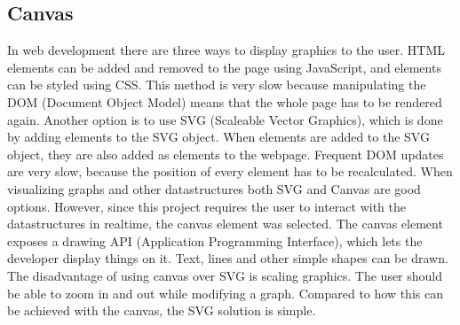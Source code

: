 \subsection{Canvas}
In web development there are three ways to display graphics to the user. HTML elements can be added and removed to the page using JavaScript, and elements can be styled using CSS. This method is very slow because manipulating the DOM (Document Object Model) means that the whole page has to be rendered again. Another option is to use SVG (Scaleable Vector Graphics)\cite{SVG:Info}, which is done by adding elements to the SVG object. When elements are added to the SVG object, they are also added as elements to the webpage. Frequent DOM updates are very slow, because the position of every element has to be recalculated. When visualizing graphs and other datastructures both SVG and Canvas\cite{Canvas:Info} are good options. However, since this project requires the user to interact with the datastructures in realtime, the canvas element was selected. The canvas element exposes a drawing API (Application Programming Interface), which lets the developer display things on it. Text, lines and other simple shapes can be drawn. The disadvantage of using canvas over SVG is scaling graphics. The user should be able to zoom in and out while modifying a graph. Compared to how this can be achieved with the canvas, the SVG solution is simple.